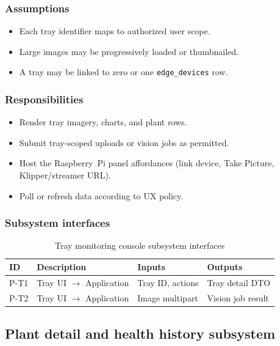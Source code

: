 \subsubsection{Assumptions}
\begin{itemize}
  \item Each tray identifier maps to authorized user scope.
  \item Large images may be progressively loaded or thumbnailed.
  \item A tray may be linked to zero or one \texttt{edge\_devices} row.
\end{itemize}

\subsubsection{Responsibilities}
\begin{itemize}
  \item Render tray imagery, charts, and plant rows.
  \item Submit tray-scoped uploads or vision jobs as permitted.
  \item Host the Raspberry~Pi panel affordances (link device, Take Picture, Klipper/streamer URL).
  \item Poll or refresh data according to UX policy.
\end{itemize}

\subsubsection{Subsystem interfaces}
\begin{table}[H]
\centering
\small
\begin{tabular}{|p{0.9cm}|p{3.4cm}|p{3.0cm}|p{3.5cm}|}
\hline
\textbf{ID} & \textbf{Description} & \textbf{Inputs} & \textbf{Outputs} \\
\hline
P-T1 & Tray UI $\rightarrow$ Application & Tray ID, actions & Tray detail DTO \\
\hline
P-T2 & Tray UI $\rightarrow$ Application & Image multipart & Vision job result \\
\hline
\end{tabular}
\caption{Tray monitoring console subsystem interfaces}
\end{table}

\subsection{Plant detail and health history subsystem}

